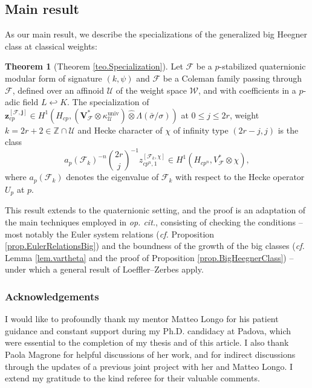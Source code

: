 \documentclass[a4paper]{amsart}
\numberwithin{equation}{section}
\theoremstyle{definition}
\newtheorem*{theorem*}{Theorem}
\newcommand{\Z}{\mathbb{Z}}
\begin{document}
\subsection{Main result}
As our main result, we describe the specializations of the generalized big Heegner class at classical weights:

\begin{theorem*}[Theorem \ref{teo.Specialization}]
Let $\mathcal{F}$ be a $p$-stabilized quaternionic modular form of signature $(k,\psi)$ and $\mathscr{F}$ be a Coleman family passing through $\mathcal{F}$, defined over an affinoid $\mathscr{U}$ of the weight space $\mathscr{W}$, and with coefficients in a $p$-adic field $L\hookleftarrow K$. The specialization of $\mathbf{z}_{cp}^{[\mathscr{F},\mathbf{j}]}\in H^1(H_{cp},(\mathbf{V}_\mathscr{F}^*\otimes\kappa^\mathrm{univ}_\mathscr{U})\widehat{\otimes}\Lambda(\bar{\sigma}/\sigma))$ at $0\le j\le 2r$, weight $k=2r+2\in\Z\cap\mathscr{U}$ and Hecke character of $\chi$ of infinity type $(2r-j,j)$ is the class \[a_p(\mathcal{F}_k)^{-n}\binom{2r}{j}^{-1}z_{cp^n,1}^{[\mathcal{F}_{k},\chi]}\in H^1(H_{cp^n},V_{\mathscr{F}}^\ast\otimes\chi),\] where $a_p(\mathcal{F}_k)$ denotes the eigenvalue of $\mathcal{F}_k$ with respect to the Hecke operator $U_p$ at $p$.
\end{theorem*}

This result extends \cite[Theorem 5.4.1]{JetchevLoefflerZerbes} to the quaternionic setting, and the proof is an adaptation of the main techniques employed in \textit{op. cit.}, consisting of checking the conditions -- most notably the Euler system relations (\textit{cf.} Proposition \ref{prop.EulerRelationsBig}) and the boundness of the growth of the big classes (\textit{cf.} Lemma \ref{lem.vartheta} and the proof of Proposition \ref{prop.BigHeegnerClass}) -- under which a general result of Loeffler--Zerbes \cite[Proposition 2.3.3]{LoefflerZerbes.Rankin} apply.

\subsubsection*{Acknowledgements}
I would like to profoundly thank my mentor Matteo Longo for his patient guidance and constant support during my Ph.D. candidacy at Padova, which were essential to the completion of my thesis and of this article. I also thank Paola Magrone for helpful discussions of her work, and for indirect discussions through the updates of a previous joint project with her and Matteo Longo. I extend my gratitude to the kind referee for their valuable comments.
\end{document}
